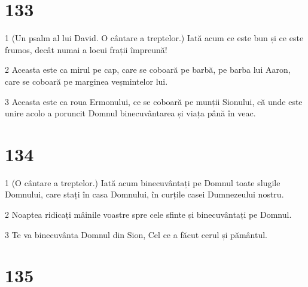 \chapter{133}

\par 1 (Un psalm al lui David. O cântare a treptelor.) Iată acum ce este bun și ce este frumos, decât numai a locui frații împreună!
\par 2 Aceasta este ca mirul pe cap, care se coboară pe barbă, pe barba lui Aaron, care se coboară pe marginea veșmintelor lui.
\par 3 Aceasta este ca roua Ermonului, ce se coboară pe munții Sionului, că unde este unire acolo a poruncit Domnul binecuvântarea și viața până în veac.

\chapter{134}

\par 1 (O cântare a treptelor.) Iată acum binecuvântați pe Domnul toate slugile Domnului, care stați în casa Domnului, în curțile casei Dumnezeului nostru.
\par 2 Noaptea ridicați mâinile voastre spre cele sfinte și binecuvântați pe Domnul.
\par 3 Te va binecuvânta Domnul din Sion, Cel ce a făcut cerul și pământul.

\chapter{135}

